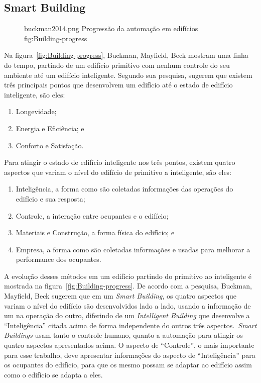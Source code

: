 \subsection{Smart Building}
\begin{figure}[H]
    {buckman2014.png}                 %
    {Progressão da automação em edifícios}     %
    {fig:Building-progress}                      %
\end{figure}
Na figura~\ref{fig:Building-progress}, Buckman, Mayfield, Beck mostram uma linha do tempo, partindo de um edifício primitivo com nenhum 
controle do seu ambiente até um edifício inteligente. Segundo sua pesquisa, sugerem que existem três principais pontos que desenvolvem 
um edifício até o estado de edifício inteligente, são eles:
\begin{enumerate}
    \item Longevidade;
    \item Energia e Eficiência; e
    \item Conforto e Satisfação.
\end{enumerate}
Para atingir o estado de edifício inteligente nos três pontos, existem quatro aspectos que variam o nível do edifício de primitivo a inteligente, são eles:
\begin{enumerate}
    \item Inteligência, a forma como são coletadas informações das operações do edifício e sua resposta;
    \item Controle, a interação entre ocupantes e o edifício;
    \item Materiais e Construção, a forma física do edifício; e
    \item Empresa, a forma como são coletadas informações e usadas para melhorar a performance dos ocupantes.
\end{enumerate}
A evolução desses métodos em um edifício partindo do primitivo ao inteligente é mostrada na figura~\ref{fig:Building-progress}.
De acordo com a pesquisa, Buckman, Mayfield, Beck sugerem que em um \emph{Smart Building}, os quatro aspectos que variam o nível 
do edifício são desenvolvidos lado a lado, usando a informação de um na operação do outro, diferindo de um \emph{Intelligent Building} que 
desenvolve a ``Inteligência'' citada acima de forma independente do outros três aspectos.\ \emph{Smart Buildings} usam tanto o controle humano, 
quanto a automação para atingir os quatro aspectos apresentados acima. O aspecto de ``Controle'', o mais importante para esse trabalho, 
deve apresentar informações do aspecto de ``Inteligência'' para os ocupantes do edifício, para que os mesmo possam se adaptar ao edifício 
assim como o edifício se adapta a eles\cite{Buckman2014}.

